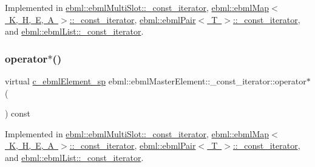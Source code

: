 Implemented in \mbox{\hyperlink{classebml_1_1ebmlMultiSlot_1_1__const__iterator_a9a1c8df8a22d52ecb55de9f151f383e0}{ebml\+::ebml\+Multi\+Slot\+::\+\_\+const\+\_\+iterator}}, \mbox{\hyperlink{classebml_1_1ebmlMap_1_1__const__iterator_aa63b9e3fd20c1092792db91a25fb2b70}{ebml\+::ebml\+Map$<$ K, H, E, A $>$\+::\+\_\+const\+\_\+iterator}}, \mbox{\hyperlink{classebml_1_1ebmlPair_1_1__const__iterator_ae764d0a947293d8383d98c3105ce2fa7}{ebml\+::ebml\+Pair$<$ T $>$\+::\+\_\+const\+\_\+iterator}}, and \mbox{\hyperlink{classebml_1_1ebmlList_1_1__const__iterator_a21d545577f7b61b40ce961d5c9a83cce}{ebml\+::ebml\+List\+::\+\_\+const\+\_\+iterator}}.

\mbox{\label{classebml_1_1ebmlMasterElement_1_1__const__iterator_aa3e5459826695a9043745fbbaea9cd47}} 
\subsubsection{\texorpdfstring{operator$\ast$()}{operator*()}}
{\footnotesize\ttfamily virtual \mbox{\hyperlink{namespaceebml_a2deef4e8071531b32e3533f1bf978917}{c\+\_\+ebml\+Element\+\_\+sp}} ebml\+::ebml\+Master\+Element\+::\+\_\+const\+\_\+iterator\+::operator$\ast$ (\begin{DoxyParamCaption}{ }\end{DoxyParamCaption}) const\hspace{0.3cm}{\ttfamily [pure virtual]}}



Implemented in \mbox{\hyperlink{classebml_1_1ebmlMultiSlot_1_1__const__iterator_ad4dfa7a3f08d535fe83c93c762009483}{ebml\+::ebml\+Multi\+Slot\+::\+\_\+const\+\_\+iterator}}, \mbox{\hyperlink{classebml_1_1ebmlMap_1_1__const__iterator_a7385fe1f7e51cdf2c4c538e9cc474583}{ebml\+::ebml\+Map$<$ K, H, E, A $>$\+::\+\_\+const\+\_\+iterator}}, \mbox{\hyperlink{classebml_1_1ebmlPair_1_1__const__iterator_ad5d24ee7d47113fbde6e2dc895b5b80a}{ebml\+::ebml\+Pair$<$ T $>$\+::\+\_\+const\+\_\+iterator}}, and \mbox{\hyperlink{classebml_1_1ebmlList_1_1__const__iterator_abc0aa1dd7a1d159c1a6f8c77e2736b80}{ebml\+::ebml\+List\+::\+\_\+const\+\_\+iterator}}.

